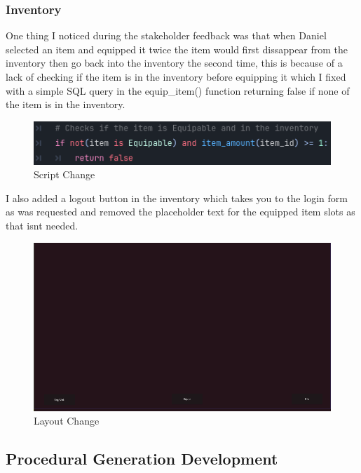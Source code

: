 \documentclass{article}
\begin{document}
        \subsubsection{Inventory}
        One thing I noticed during the stakeholder feedback was that when Daniel selected an item and equipped it twice the item would first dissappear from the inventory then go back into the inventory the second time, this is because of a lack of checking if the item is in the inventory before equipping it which I fixed with a simple SQL query in the equip\_item() function returning false if none of the item is in the inventory.\\
        \begin{figure}[H]
                \centering
                \includegraphics[width = 0.8\columnwidth]{images/development/Inventory_script2.PNG}
                \caption{Script Change}
        \end{figure}
        I also added a logout button in the inventory which takes you to the login form as was requested and removed the placeholder text for the equipped item slots as that isnt needed.\\
        \begin{figure}[H]
                \centering
                \includegraphics[width = 0.8\columnwidth]{images/development/Inventory_layout2.PNG}
                \caption{Layout Change}
        \end{figure}
        \subsection{Procedural Generation Development}
\end{document}
